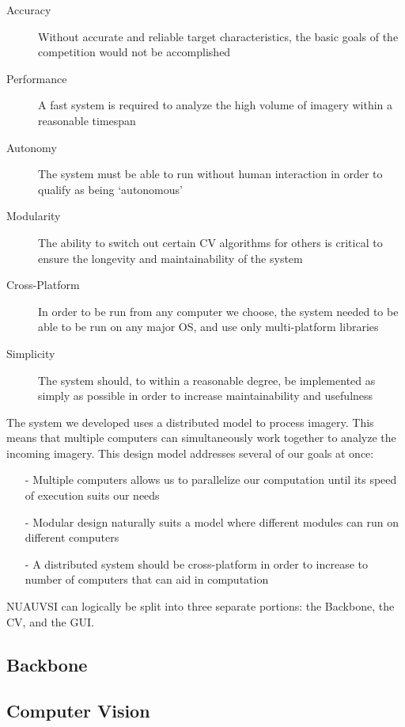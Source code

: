 \documentclass{article}
\begin{document}
\begin{description}
\item[Accuracy] Without accurate and reliable target characteristics, the basic goals of the competition would not be accomplished
\item[Performance] A fast system is required to analyze the high volume of imagery within a reasonable timespan
\item[Autonomy] The system must be able to run without human interaction in order to qualify as being `autonomous'
\item[Modularity] The ability to switch out certain CV algorithms for others is critical to ensure the longevity and maintainability of the system
\item[Cross-Platform] In order to be run from any computer we choose, the system needed to be able to be run on any major OS, and use only multi-platform libraries
\item[Simplicity] The system should, to within a reasonable degree, be implemented as simply as possible in order to increase maintainability and usefulness
\end{description}

The system we developed uses a distributed model to process imagery. This means that multiple computers can simultaneously work together to analyze the incoming imagery. This design model addresses several of our goals at once:

\begin{itemize}
\item[-] Multiple computers allows us to parallelize our computation until its speed of execution suits our needs
\item[-] Modular design naturally suits a model where different modules can run on different computers
\item[-] A distributed system should be cross-platform in order to increase to number of computers that can aid in computation
\end{itemize}
NUAUVSI can logically be split into three separate portions: the Backbone, the CV, and the GUI.

\subsection{Backbone}

\subsection{Computer Vision}
\end{document}
